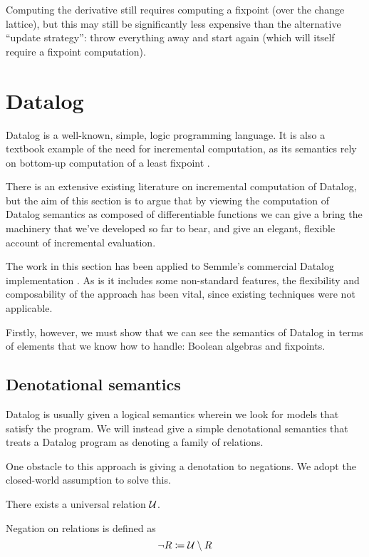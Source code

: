 Computing the derivative still requires computing a fixpoint (over the change
lattice), but this may still be significantly less expensive than the
alternative ``update strategy'': throw everything away and start
again (which will itself require a fixpoint computation).

\section{Datalog}
\label{sec:datalog}

Datalog is a well-known, simple, logic programming language. It is also a textbook
example of the need for incremental computation, as its semantics rely on
bottom-up computation of a least fixpoint \autocite[See][part D]{abiteboul1995foundations}.

There is an extensive existing literature on incremental computation of Datalog,
but the aim of this section is to argue that by viewing the computation
of Datalog semantics as composed of differentiable functions we can give a
bring the machinery that we've developed so far to bear, and give an elegant,
flexible account of incremental evaluation.

The work in this section has been applied to Semmle's commercial Datalog
implementation \autocites{semmleWebsite}{avgustinov2016ql}{sereni2008adding}{schafer2010type}.
As is it includes some non-standard features, the flexibility and composability
of the approach has been vital, since existing techniques were not applicable.

Firstly, however, we must show that we can see the semantics of Datalog in terms
of elements that we know how to handle: Boolean algebras and fixpoints.

\subsection{Denotational semantics}

Datalog is usually given a logical semantics wherein we look for models that
satisfy the program. We will instead give a simple denotational semantics that treats a Datalog
program as denoting a family of relations.

One obstacle to this approach is giving a denotation to negations. We adopt the
closed-world assumption to solve this.

\begin{defn}
  There exists a universal relation $\mathcal{U}$.

  Negation on relations is defined as $$\neg R \coloneqq \mathcal{U} \setminus R$$
\end{defn}

